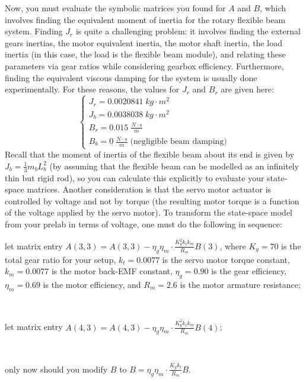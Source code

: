 \documentclass[12pt]{report}
\newcommand{\indentitem}{\setlength\itemindent{25pt}}
\begin{document}
Now, you must evaluate the symbolic matrices you found for $A$ and $B$, which involves finding the equivalent moment of inertia for the rotary flexible beam system. Finding $J_r$ is quite a challenging problem: it involves finding the external gears inertias, the motor equivalent inertia, the motor shaft inertia, the load inertia (in this case, the load is the flexible beam module), and relating these parameters via gear ratios while considering gearbox efficiency. Furthermore, finding the equivalent viscous damping for the system is usually done experimentally. For these reasons, the values for $J_r$ and $B_r$ are given here:
\[
    \begin{cases}
        J_r = 0.0020841 \; kg \cdot m^2   \\
        J_b = 0.0038038 \; kg \cdot m^2   \\
        B_r = 0.015 \; \frac{N\cdot s}{m} \\
        B_b = 0 \; \frac{N\cdot s}{m} \; \text{(negligible beam damping)}
    \end{cases}
\]
Recall that the moment of inertia of the flexible beam about its end is given by $J_b = \frac{1}{3} m_b L_{b}^2$ (by assuming that the flexible beam can be modelled as an infinitely thin but rigid rod), so you can calculate this explicitly to evaluate your state-space matrices. Another consideration is that the servo motor actuator is controlled by voltage and not by torque (the resulting motor torque is a function of the voltage applied by the servo motor). To transform the state-space model from your prelab in terms of voltage, one must do the following in sequence:
\begin{enumerate}
    {\indentitem \item[Step 1:] let matrix entry $A(3,3) = A(3,3) - \eta_g \eta_m \cdot \frac{K_{g}^2 k_t k_m}{R_m} B(3)$, where $K_g=70$ is the total gear ratio for your setup, $k_t=0.0077$ is the servo motor torque constant, $k_m = 0.0077$ is the motor back-EMF constant, $\eta_g = 0.90$ is the gear efficiency, $\eta_m = 0.69$ is the motor efficiency, and $R_m=2.6$ is the motor armature resistance;} \\
          {\indentitem \item[Step 2:] let matrix entry $A(4,3) = A(4,3) - \eta_g \eta_m \cdot \frac{K_{g}^2 k_t k_m}{R_m} B(4)$;} \\
          {\indentitem \item[Step 3:] only now should you modify $B$ to $B = \eta_g \eta_m \cdot \frac{K_g k_t}{R_m} B$.}
\end{enumerate}
\end{document}
